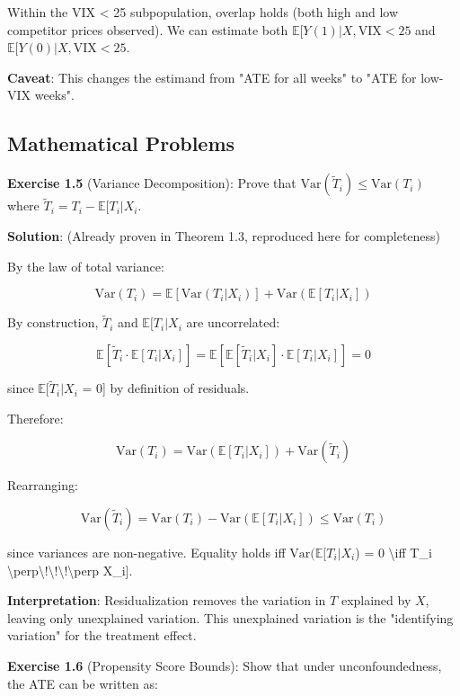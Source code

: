 Within the VIX \textless{} 25 subpopulation, overlap holds (both high
and low competitor prices observed). We can estimate both
\(\mathbb{E}[Y(1) | X, \text{VIX} < 25\) and
\(\mathbb{E}[Y(0) | X, \text{VIX} < 25\).

\textbf{Caveat}: This changes the estimand from "ATE for all weeks" to
"ATE for low-VIX weeks".

\subsection{Mathematical Problems}\label{_mathematical_problems}

\textbf{Exercise 1.5} (Variance Decomposition): Prove that
\(\text{Var}(\tilde{T}_i) \leq \text{Var}(T_i)\) where
\(\tilde{T}_i = T_i - \mathbb{E}[T_i | X_i\).

\textbf{Solution}: (Already proven in Theorem 1.3, reproduced here for
completeness)

By the law of total variance:

\[\text{Var}(T_i) = \mathbb{E}[\text{Var}(T_i | X_i)] + \text{Var}(\mathbb{E}[T_i | X_i])\]

By construction, \(\tilde{T}_i\) and \(\mathbb{E}[T_i | X_i\) are
uncorrelated:

\[\mathbb{E}[\tilde{T}_i \cdot \mathbb{E}[T_i | X_i]] = \mathbb{E}[\mathbb{E}[\tilde{T}_i | X_i] \cdot \mathbb{E}[T_i | X_i]] = 0\]

since \(\mathbb{E}[\tilde{T}_i | X_i\) = 0{]} by definition of
residuals.

Therefore:

\[\text{Var}(T_i) = \text{Var}(\mathbb{E}[T_i | X_i]) + \text{Var}(\tilde{T}_i)\]

Rearranging:

\[\text{Var}(\tilde{T}_i) = \text{Var}(T_i) - \text{Var}(\mathbb{E}[T_i | X_i]) \leq \text{Var}(T_i)\]

since variances are non-negative. Equality holds iff
\(\text{Var}(\mathbb{E}[T_i | X_i\)) = 0 \textbackslash iff T\_i
\textbackslash perp\textbackslash!\textbackslash!\textbackslash!\textbackslash perp
X\_i{]}.

\textbf{Interpretation}: Residualization removes the variation in \(T\)
explained by \(X\), leaving only unexplained variation. This unexplained
variation is the "identifying variation" for the treatment effect.

\textbf{Exercise 1.6} (Propensity Score Bounds): Show that under
unconfoundedness, the ATE can be written as:

